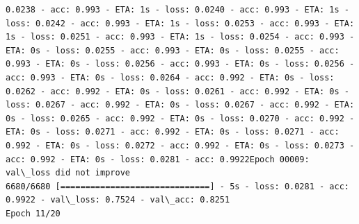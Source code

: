 \documentclass[11pt]{article}
\begin{document}
\begin{Verbatim}[commandchars=\\\{\}]
0.0238 - acc: 0.993 - ETA: 1s - loss: 0.0240 - acc: 0.993 - ETA: 1s - loss: 0.0242 - acc: 0.993 - ETA: 1s - loss: 0.0253 - acc: 0.993 - ETA: 1s - loss: 0.0251 - acc: 0.993 - ETA: 1s - loss: 0.0254 - acc: 0.993 - ETA: 0s - loss: 0.0255 - acc: 0.993 - ETA: 0s - loss: 0.0255 - acc: 0.993 - ETA: 0s - loss: 0.0256 - acc: 0.993 - ETA: 0s - loss: 0.0256 - acc: 0.993 - ETA: 0s - loss: 0.0264 - acc: 0.992 - ETA: 0s - loss: 0.0262 - acc: 0.992 - ETA: 0s - loss: 0.0261 - acc: 0.992 - ETA: 0s - loss: 0.0267 - acc: 0.992 - ETA: 0s - loss: 0.0267 - acc: 0.992 - ETA: 0s - loss: 0.0265 - acc: 0.992 - ETA: 0s - loss: 0.0270 - acc: 0.992 - ETA: 0s - loss: 0.0271 - acc: 0.992 - ETA: 0s - loss: 0.0271 - acc: 0.992 - ETA: 0s - loss: 0.0272 - acc: 0.992 - ETA: 0s - loss: 0.0273 - acc: 0.992 - ETA: 0s - loss: 0.0281 - acc: 0.9922Epoch 00009: val\_loss did not improve
6680/6680 [==============================] - 5s - loss: 0.0281 - acc: 0.9922 - val\_loss: 0.7524 - val\_acc: 0.8251
Epoch 11/20

\end{Verbatim}
\end{document}
